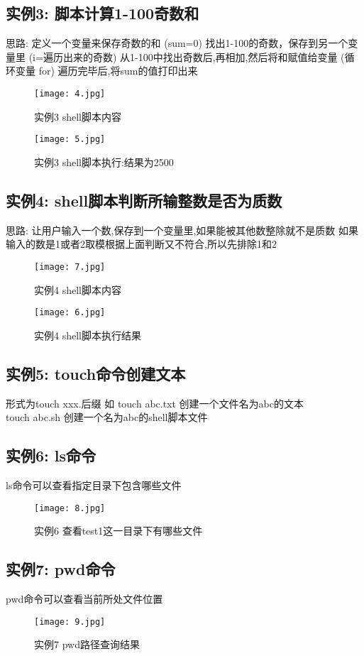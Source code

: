 \documentclass[a4paper, 12pt]{article}
\begin{document}
  \subsection{实例3: 脚本计算1-100奇数和}
  思路: 定义一个变量来保存奇数的和 (sum=0)
  找出1-100的奇数，保存到另一个变量里 (i=遍历出来的奇数)
  从1-100中找出奇数后,再相加,然后将和赋值给变量 (循环变量 for) 遍历完毕后,将sum的值打印出来
  \begin{figure}[h!]
    \centering
    \texttt{[image: 4.jpg]}
    \caption{实例3 shell脚本内容}
  \end{figure}
  \begin{figure}[h!]
    \centering
    \texttt{[image: 5.jpg]}
    \caption{实例3 shell脚本执行:结果为2500}
  \end{figure}

  \subsection{实例4: shell脚本判断所输整数是否为质数}
  思路: 让用户输入一个数,保存到一个变量里,如果能被其他数整除就不是质数
  如果输入的数是1或者2取模根据上面判断又不符合,所以先排除1和2
  \begin{figure}[h!]
    \centering
    \texttt{[image: 7.jpg]}
    \caption{实例4 shell脚本内容}
  \end{figure}
  \begin{figure}[h!]
    \centering
    \texttt{[image: 6.jpg]}
    \caption{实例4 shell脚本执行结果}
  \end{figure}

  \subsection{实例5: touch命令创建文本}
形式为touch xxx.后缀 如 touch abc.txt 创建一个文件名为abc的文本\\
touch abc.sh 创建一个名为abc的shell脚本文件


 \subsection{实例6: ls命令}
 ls命令可以查看指定目录下包含哪些文件
 \begin{figure}[h!]
    \centering
    \texttt{[image: 8.jpg]}
    \caption{实例6 查看test1这一目录下有哪些文件}
  \end{figure}

  \subsection{实例7: pwd命令}
  pwd命令可以查看当前所处文件位置
  \begin{figure}[h!]
    \centering
    \texttt{[image: 9.jpg]}
    \caption{实例7 pwd路径查询结果}
  \end{figure}
\end{document}
